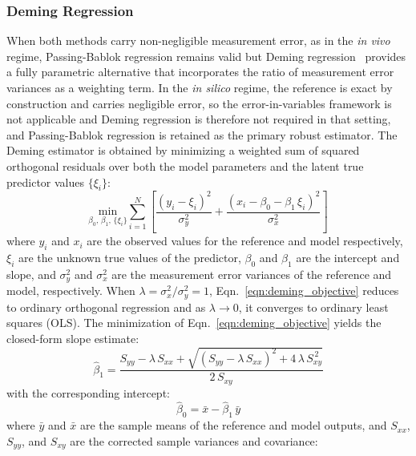 \subsubsection{Deming Regression}
When both methods carry non-negligible measurement error, as in the \textit{in vivo} regime, Passing-Bablok regression remains valid but Deming regression~\cite{Riu1997} provides a fully parametric alternative that incorporates the ratio of measurement error variances as a weighting term. In the \textit{in silico} regime, the reference is exact by construction and carries negligible error, so the error-in-variables framework is not applicable and Deming regression is therefore not required in that setting, and Passing-Bablok regression is retained as the primary robust estimator. The Deming estimator is obtained by minimizing a weighted sum of squared orthogonal residuals over both the model parameters and the latent true predictor values $\{\xi_i\}$:
\begin{equation}\label{eqn:deming_objective}
    \underset{\beta_0,\,\beta_1,\,\{\xi_i\}}{\mathrm{min}}
    \sum_{i=1}^{N}
    \left[
        \frac{\left(y_i - \xi_i\right)^2}{\sigma_y^2}
        +
        \frac{\left(x_i - \beta_0 - \beta_1\,\xi_i\right)^2}{\sigma_x^2}
    \right]
\end{equation}
\noindent where $y_i$ and $x_i$ are the observed values for the reference and \DL model respectively, $\xi_i$ are the unknown true values of the predictor, $\beta_0$ and $\beta_1$ are the intercept and slope, and $\sigma_y^2$ and $\sigma_x^2$ are the measurement error variances of the reference and \DL model, respectively. When $\lambda = \sigma_x^2 / \sigma_y^2 = 1$, Eqn.~\ref{eqn:deming_objective} reduces to ordinary orthogonal regression and as $\lambda \to 0$, it converges to ordinary least squares (OLS). The minimization of Eqn.~\ref{eqn:deming_objective} yields the closed-form slope estimate:
\begin{equation}\label{eqn:deming_slope}
    \hat{\beta}_1 =
    \frac{
        S_{yy} - \lambda\, S_{xx}
        + \sqrt{\left(S_{yy} - \lambda\, S_{xx}\right)^2
                + 4\,\lambda\, S_{xy}^{\,2}}
    }{
        2\, S_{xy}
    }
\end{equation}
\noindent with the corresponding intercept:
\begin{equation}\label{eqn:deming_intercept}
    \hat{\beta}_0 = \bar{x} - \hat{\beta}_1\,\bar{y}
\end{equation}
\noindent where $\bar{y}$ and $\bar{x}$ are the sample means of the reference and \DL model outputs, and $S_{xx}$, $S_{yy}$, and $S_{xy}$ are the corrected sample variances and covariance:
